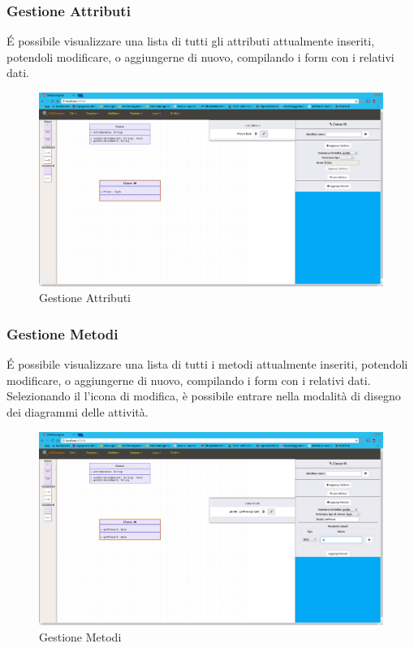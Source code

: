 \subsubsection{Gestione Attributi}
É possibile visualizzare una lista di tutti gli attributi attualmente inseriti, potendoli modificare, o aggiungerne di nuovo, compilando i form con i relativi dati.
\begin{figure}[h!]
	\centering
		\includegraphics[scale=0.22]{res/img/modAttrib.png}
	\caption{Gestione Attributi}
\end{figure}
\newpage

\subsubsection{Gestione Metodi}
É possibile visualizzare una lista di tutti i metodi attualmente inseriti, potendoli modificare, o aggiungerne di nuovo, compilando i form con i relativi dati. Selezionando il l'icona di modifica, è possibile entrare nella modalità di disegno dei diagrammi delle attività.
\begin{figure}[h!]
	\centering
		\includegraphics[scale=0.22]{res/img/editMetod.png}
	\caption{Gestione Metodi}
\end{figure}